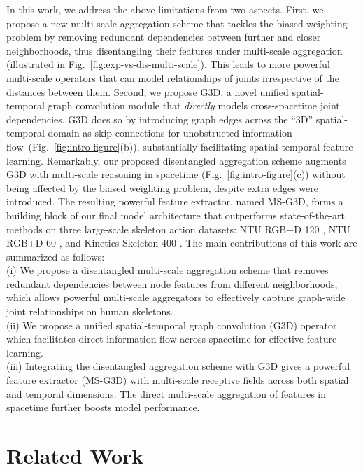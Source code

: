 \documentclass[10pt,twocolumn,letterpaper]{article}
\begin{document}
In this work, we address the above limitations from two aspects.
First, we propose a new multi-scale aggregation scheme that tackles the biased weighting problem by removing redundant dependencies between further and closer neighborhoods, thus disentangling their features under multi-scale aggregation (illustrated in Fig.~\ref{fig:exp-vs-dis-multi-scale}). This leads to more powerful multi-scale operators that can model relationships of joints irrespective of the distances between them.
Second, we propose G3D, a novel unified spatial-temporal graph convolution module that \textit{directly} models cross-spacetime joint dependencies.
G3D does so by introducing graph edges across the ``3D'' spatial-temporal domain as skip connections for unobstructed information flow~(Fig.~\ref{fig:intro-figure}(b)), substantially facilitating spatial-temporal feature learning.
Remarkably, our proposed disentangled aggregation scheme augments G3D with multi-scale reasoning in spacetime (Fig.~\ref{fig:intro-figure}(c)) without being affected by the biased weighting problem, despite extra edges were introduced.
The resulting powerful feature extractor, named MS-G3D, forms a building block of our final model architecture that outperforms state-of-the-art methods on three large-scale skeleton action datasets:
NTU RGB+D 120 \cite{ntu-rgbd-120}, NTU RGB+D 60 \cite{ntu60}, and Kinetics Skeleton 400 \cite{kinetics-dataset}.
The main contributions of this work are summarized as follows:
\\ [2mm]
(i) We propose a disentangled multi-scale aggregation scheme that removes redundant dependencies between node features from different neighborhoods, which allows powerful multi-scale aggregators to effectively capture graph-wide joint relationships on human skeletons.
\\ [2mm]
(ii) We propose a unified spatial-temporal graph convolution (G3D) operator which facilitates direct information flow across spacetime for effective feature learning.
\\ [2mm]
(iii)
Integrating the disentangled aggregation scheme with G3D gives a powerful feature extractor (MS-G3D) with multi-scale receptive fields across both spatial and temporal dimensions.
The direct multi-scale aggregation of features in spacetime further boosts model performance.



\section{Related Work}
\end{document}
